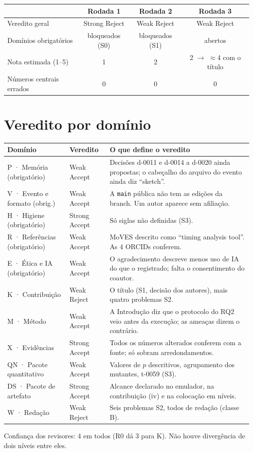 \documentclass[10pt,a4paper]{article}
\newcommand{\vSR}{\cellcolor{SR}Strong Reject}
\newcommand{\vWR}{\cellcolor{WR}Weak Reject}
\newcommand{\vWA}{\cellcolor{WA}Weak Accept}
\newcommand{\vSA}{\cellcolor{SA}Strong Accept}
\begin{document}
\begin{center}
\begin{tabular}{@{}lccc@{}}
\toprule
 & \textbf{Rodada 1} & \textbf{Rodada 2} & \textbf{Rodada 3}\\
\midrule
Veredito geral & \vSR & \vWR & \vWR\\
Domínios obrigatórios & bloqueados (S0) & bloqueados (S1) & \cellcolor{SA}abertos\\
Nota estimada (1--5) & 1 & 2 & 2 $\rightarrow$ $\approx$4 com o título\\
Números centrais errados & 0 & 0 & 0\\
\bottomrule
\end{tabular}
\end{center}

\section{Veredito por domínio}

{\small
\begin{xltabular}{\linewidth}{@{}l>{\centering\arraybackslash}p{2.6cm}X@{}}
\toprule
\textbf{Domínio} & \textbf{Veredito} & \textbf{O que define o veredito}\\
\midrule\endhead
P · Memória (obrigatório) & \vWA & Decisões d-0011 e d-0014 a d-0020 ainda propostas; o cabeçalho do arquivo do evento ainda diz ``sketch''.\\
V · Evento e formato (obrig.) & \vWA & A \texttt{main} pública não tem as edições da branch. Um autor aparece sem afiliação.\\
H · Higiene (obrigatório) & \vSA & Só siglas não definidas (S3).\\
R · Referências (obrigatório) & \vWA & MoVES descrito como ``timing analysis tool''. As 4 ORCIDs conferem.\\
E · Ética e IA (obrigatório) & \vWA & O agradecimento descreve menos uso de IA do que o registrado; falta o consentimento do coautor.\\
K · Contribuição & \vWR & O título (S1, decisão dos autores), mais quatro problemas S2.\\
M · Método & \vWA & A Introdução diz que o protocolo do RQ2 veio antes da execução; as ameaças dizem o contrário.\\
X · Evidências & \vSA & Todos os números alterados conferem com a fonte; só sobram arredondamentos.\\
QN · Pacote quantitativo & \vWA & Valores de $p$ descritivos, agrupamento dos mutantes, t-0059 (S3).\\
DS · Pacote de artefato & \vSA & Alcance declarado no emulador, na contribuição (iv) e na colocação em níveis.\\
W · Redação & \vWR & Seis problemas S2, todos de redação (classe B).\\
\bottomrule
\end{xltabular}}
{\small\color{muted}Confiança dos revisores: 4 em todos (R0 dá 3 para K). Não houve divergência de dois níveis entre eles.}
\end{document}
